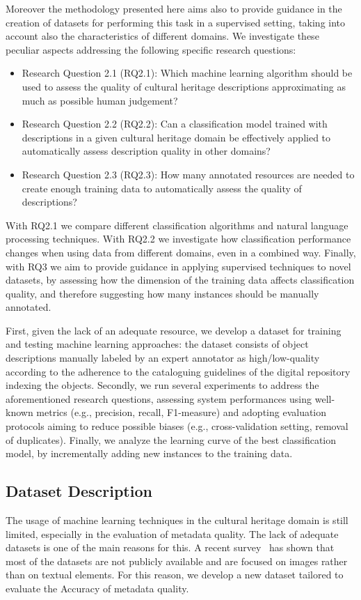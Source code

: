 \documentclass[epsfig,a4paper,12pt,titlepage]{book}
\begin{document}
Moreover the methodology presented here aims also to provide guidance in the creation of datasets for performing this task in a supervised setting, taking into account also the characteristics of different domains.
	We investigate these peculiar aspects addressing the following specific research questions:
	\begin{itemize}
		\item Research Question 2.1 (RQ2.1): Which machine learning algorithm should be used to assess the quality
of cultural heritage descriptions approximating as much as possible human judgement?
		\item Research Question 2.2 (RQ2.2):  
		Can a classification model trained with descriptions in a given cultural heritage domain be effectively applied to automatically assess description quality in other domains?
		\item Research Question 2.3 (RQ2.3): How many annotated resources are needed to create enough training data to automatically assess the quality of descriptions?
	\end{itemize}
With RQ2.1 we compare different classification algorithms and natural language processing techniques. With RQ2.2 we investigate how classification performance changes when using data from different domains, even in a combined way. Finally, with RQ3 we aim to provide guidance in applying supervised techniques to novel datasets, by assessing how the dimension of the training data affects classification quality, and therefore suggesting how many instances should be manually annotated. 

First, given the lack of an adequate resource, we develop a dataset for training and testing machine learning approaches: the dataset consists of object descriptions manually labeled by an expert annotator as high/low-quality according to the adherence to the cataloguing guidelines of the digital repository indexing the objects. Secondly, we run several experiments to address the aforementioned research questions, assessing system performances using well-known metrics (e.g., precision, recall, F1-measure) and adopting evaluation protocols aiming to reduce possible biases (e.g., cross-validation setting, removal of duplicates). Finally, we analyze the learning curve of the best classification model, by incrementally adding new instances to the training data.


\subsection{Dataset Description}
\label{subsec:dataset}
The usage of machine learning techniques in the cultural heritage domain is still limited, especially in the evaluation of metadata quality. The lack of adequate datasets is one of the main reasons for this. A recent survey~\cite{fiorucci2020machine} has shown that most of the datasets  are not publicly available and are focused on images rather than on textual elements. For this reason, we develop a new dataset tailored to evaluate the Accuracy of metadata quality.  
\end{document}
